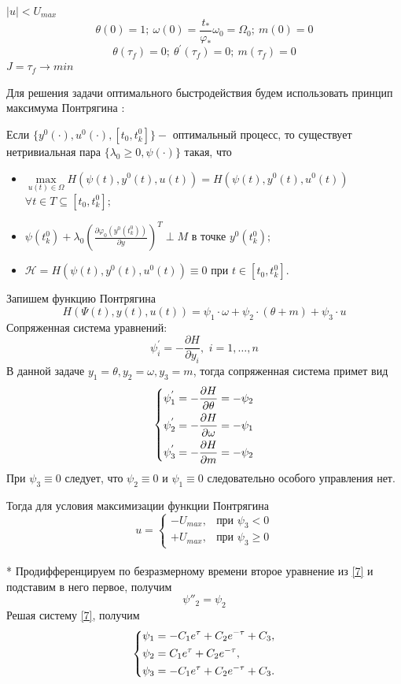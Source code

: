 \documentclass[a4paper,14pt]{article}
\theoremstyle{plain} %
\theoremstyle{definition} %
\theoremstyle{remark} %
\begin{document}
{$|u|<U_{max}$
\[
    \theta(0)=1;\ \omega(0)=\frac{t_\ast}{\varphi_\ast}\omega_0=\Omega_0;\ m(0)=0
\]
\[
    \theta(\tau_f)=0;\ \theta^{'}(\tau_f)=0;\ m(\tau_f)=0
\]
$J=\tau_f\to min$

Для решения задачи оптимального быстродействия будем использовать принцип максимума Понтрягина \cite{Optimal}:

Если $\{y^0(\cdot),u^0(\cdot),[t_0,t_k^0]\} - $ оптимальный процесс, то существует нетривиальная пара $\{\lambda_0\geq0,\psi(\cdot)\}$
такая, что
\begin{itemize}
    \item $ \mathop {\max }\limits_{u(t) \in \Omega}  H(\psi(t),y^0(t),u(t))=H(\psi(t),y^0(t),u^0(t))$
          $\forall t \in T \subseteq [t_0,t_k^0];$
    \item $\psi(t_k^0)+\lambda_0(\frac{\partial \varphi_0(y^0(t_k^0))}{\partial y})^T \perp M \text{ в точке } y^0(t_k^0);$
    \item $\mathcal{H}=H(\psi(t),y^0(t),u^0(t))\equiv0 \text{ при } t \in [t_0,t_k^0].$
\end{itemize}
Запишем функцию Понтрягина
\[
    H(\Psi(t),y(t),u(t))=\psi_1\cdot\omega+\psi_2\cdot(\theta+m)+\psi_3\cdot u
\]
Сопряженная система уравнений:
\[
    \psi^{'}_i  =  - \frac{{\partial H}}{{\partial y_i }},\,\,i = 1, \ldots ,n
\]
В данной задаче $y_1 = \theta, y_2 = \omega, y_3=m$, тогда сопряженная система примет вид
\begin{equation} \label{7}
    \left\{ {\begin{aligned}
                 & \psi^{'}_1=  - \frac{{\partial H}}{{\partial \theta}} = - \psi_2\hfill  \\
                 & \psi^{'}_2=  - \frac{{\partial H}}{{\partial \omega }} = - \psi_1\hfill \\
                 & \psi^{'}_3=  - \frac{{\partial H}}{{\partial m }} = - \psi_2 \hfill     \\
            \end{aligned}} \right.
\end{equation}
При $\psi_3\equiv0$ следует, что $\psi_2\equiv0$ и $\psi_1\equiv0$ следовательно особого управления нет.

Тогда для условия максимизации функции Понтрягина
\[
    u=
    \begin{cases}
        -U_{max}, & \text{при $\psi_3<0$}    \\
        +U_{max}, & \text{при $\psi_3\geq0$}
    \end{cases}
\]\\*
Продифференцируем по безразмерному времени второе уравнение из \eqref{7} и подставим в него первое, получим
\[
    \psi{''}_2=\psi_2
\]
Решая систему \eqref{7}, получим
\[
    \left\{ {\begin{aligned}
                 & \psi_1 = -C_1e^\tau+C_2e^{-\tau}+C_3, \hfill  \\
                 & \psi_2 = C_1e^\tau+C_2e^{-\tau} , \hfill      \\
                 & \psi_3 = -C_1e^\tau+C_2e^{-\tau}+C_3 . \hfill \\
            \end{aligned}} \right.
\]

}
\end{document}
